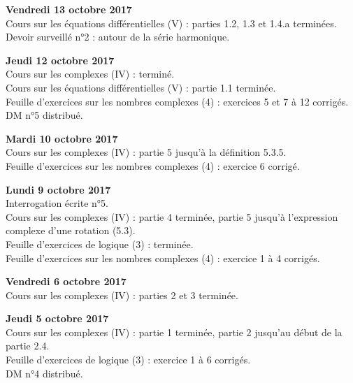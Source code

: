 \documentclass[12pt,a4paper]{article}
\begin{document}
\noindent\textbf{Vendredi 13 octobre 2017}\\
\bu{} Cours sur les équations différentielles (V) : parties 1.2, 1.3 et 1.4.a terminées. \\
\bu{} Devoir surveillé n°2 : autour de la série harmonique.\\
\vspace{.4cm}

\noindent\textbf{Jeudi 12 octobre 2017}\\
\bu{} Cours sur les complexes (IV) : terminé. \\
\bu{} Cours sur les équations différentielles (V) : partie 1.1 terminée. \\
\bu{} Feuille d'exercices sur les nombres complexes (4) : exercices 5 et 7 à 12 corrigés. \\
\bu{} DM n°5 distribué.\\
\vspace{.4cm}

\noindent\textbf{Mardi 10 octobre 2017}\\
\bu{} Cours sur les complexes (IV) : partie 5 jusqu'à la définition 5.3.5. \\
\bu{} Feuille d'exercices sur les nombres complexes (4) : exercice 6 corrigé. \\
\vspace{.4cm}

\noindent\textbf{Lundi 9 octobre 2017}\\
\bu{} Interrogation écrite n°5.\\
\bu{} Cours sur les complexes (IV) : partie 4 terminée, partie 5 jusqu'à l'expression complexe d'une rotation (5.3). \\
\bu{} Feuille d'exercices de logique (3) : terminée. \\
\bu{} Feuille d'exercices sur les nombres complexes (4) : exercice 1 à 4 corrigés. \\
\vspace{.4cm}

\noindent\textbf{Vendredi 6 octobre 2017}\\
\bu{} Cours sur les complexes (IV) : parties 2 et 3 terminée. \\
\vspace{.4cm}

\noindent\textbf{Jeudi 5 octobre 2017}\\
\bu{} Cours sur les complexes (IV) : partie 1 terminée, partie 2 jusqu'au début de la partie 2.4. \\
\bu{} Feuille d'exercices de logique (3) : exercice 1 à 6 corrigés. \\
\bu{} DM n°4 distribué.\\
\vspace{.4cm}
\end{document}
